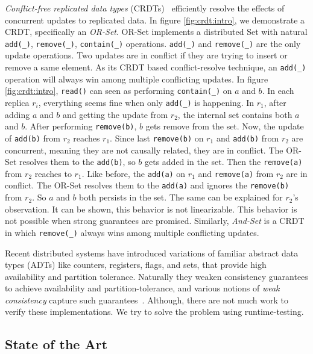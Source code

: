 \emph{Conflict-free replicated data types} (CRDTs)~\cite{DBLP:conf/sss/ShapiroPBZ11} efficiently resolve the effects of concurrent updates to replicated data. In figure \ref{fig:crdt:intro}, we demonstrate a CRDT, specifically an \emph{OR-Set}.
OR-Set implements a distributed Set with natural \texttt{add(\_)}, \texttt{remove(\_)}, \texttt{contain(\_)} operations. \texttt{add(\_)} and \texttt{remove(\_)} are the only update operations. Two updates are in conflict if they are trying to insert or remove a same element. As its CRDT based conflict-resolve technique, an \texttt{add(\_)} operation will always win among multiple conflicting updates.
In figure \ref{fig:crdt:intro}, \texttt{read()} can seen as performing \texttt{contain(\_)} on $a$ and $b$. In each replica $r_i$, everything seems fine when only \texttt{add(\_)} is happening. In $r_1$, after adding $a$ and $b$ and getting the update from $r_2$, the internal set contains both $a$ and $b$. After performing \texttt{remove(b)}, $b$ gets remove from the set. Now, the update of \texttt{add(b)} from $r_2$ reaches $r_1$. Since last \texttt{remove(b)} on $r_1$ and \texttt{add(b)} from $r_2$ are concurrent, meaning they are not causally related, they are in conflict. The OR-Set resolves them to the \texttt{add(b)}, so $b$ gets added in the set. Then the \texttt{remove(a)} from $r_2$ reaches to $r_1$. Like before, the \texttt{add(a)} on $r_1$ and \texttt{remove(a)} from $r_2$ are in conflict. The OR-Set resolves them to the \texttt{add(a)} and ignores the \texttt{remove(b)} from $r_2$. So $a$ and $b$ both persists in the set. The same can be explained for $r_2$'s observation. It can be shown, this behavior is not linearizable. This behavior is not possible when strong guarantees are promised.
Similarly, \emph{And-Set} is a CRDT in which \texttt{remove(\_)} always wins among multiple conflicting updates.

Recent distributed systems have introduced variations of familiar abstract data types (ADTs) like counters, registers, flags, and sets, that provide high availability and partition tolerance. Naturally they weaken consistency guarantees to achieve availability and partition-tolerance, and various notions of \emph{weak consistency} capture such guarantees~\cite{DBLP:conf/pdis/TerryDPSTW94, DBLP:conf/sosp/TerryTPDSH95, DBLP:conf/popl/MansonPA05, DBLP:journals/ftpl/Burckhardt14, DBLP:conf/popl/BurckhardtGYZ14}. Although, there are not much work to verify these implementations. We try to solve the problem using runtime-testing.


\subsection{State of the Art}

